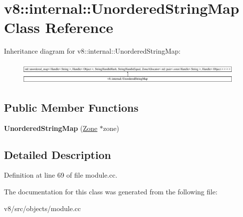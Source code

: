 \hypertarget{classv8_1_1internal_1_1UnorderedStringMap}{}\section{v8\+:\+:internal\+:\+:Unordered\+String\+Map Class Reference}
\label{classv8_1_1internal_1_1UnorderedStringMap}
Inheritance diagram for v8\+:\+:internal\+:\+:Unordered\+String\+Map\+:\begin{figure}[H]
\begin{center}
\leavevmode
\includegraphics[height=1.108911cm]{classv8_1_1internal_1_1UnorderedStringMap}
\end{center}
\end{figure}
\subsection*{Public Member Functions}
\begin{DoxyCompactItemize}
\item 
\mbox{\label{classv8_1_1internal_1_1UnorderedStringMap_a18aceb0272c737235120eca82652ff10}} 
{\bfseries Unordered\+String\+Map} (\mbox{\hyperlink{classv8_1_1internal_1_1Zone}{Zone}} $\ast$zone)
\end{DoxyCompactItemize}


\subsection{Detailed Description}


Definition at line 69 of file module.\+cc.



The documentation for this class was generated from the following file\+:\begin{DoxyCompactItemize}
\item 
v8/src/objects/module.\+cc\end{DoxyCompactItemize}

